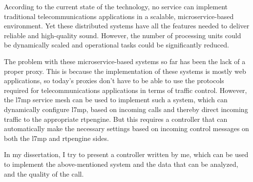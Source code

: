 According to the current state of the technology, no service can implement traditional telecommunications applications in a scalable, microservice-based environment. Yet these distributed systems have all the features needed to deliver reliable and high-quality sound. However, the number of processing units could be dynamically scaled and operational tasks could be significantly reduced.

The problem with these microservice-based systems so far has been the lack of a proper proxy. This is because the implementation of these systems is mostly web applications, so today's proxies don't have to be able to use the protocols required for telecommunications applications in terms of traffic control. However, the l7mp service mesh can be used to implement such a system, which can dynamically configure l7mp, based on incoming calls and thereby direct incoming traffic to the appropriate rtpengine. But this requires a controller that can automatically make the necessary settings based on incoming control messages on both the l7mp and rtpengine sides.

In my dissertation, I try to present a controller written by me, which can be used to implement the above-mentioned system and the data that can be analyzed, and the quality of the call.

\vfill
\selectthesislanguage

\setcounter{romanPage}{\value{page}}
